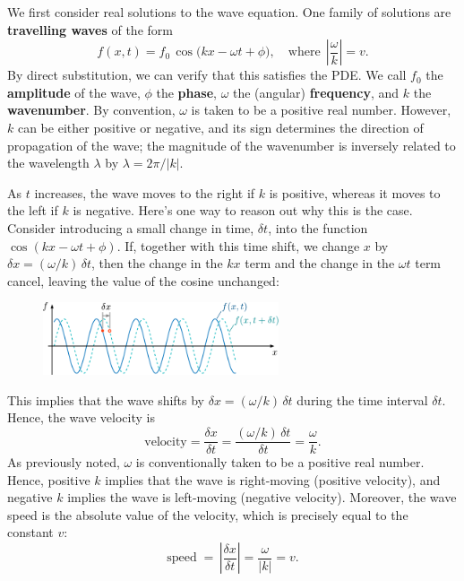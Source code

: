 \documentclass[10pt,a4paper]{article}
\begin{document}
We first consider real solutions to the wave equation. One family of
solutions are \textbf{travelling waves} of the form
\begin{equation}
f(x,t) = f_0 \, \cos\!\big(kx - \omega t + \phi\big),\quad\mathrm{where}\;\, \left|\frac{\omega}{k}\right| = v.
\label{realsol}
\end{equation}
By direct substitution, we can verify that this satisfies the PDE. We
call $f_0$ the \textbf{amplitude} of the wave, $\phi$ the
\textbf{phase}, $\omega$ the (angular) \textbf{frequency}, and $k$
the \textbf{wavenumber}. By convention, $\omega$ is taken to be a
positive real number. However, $k$ can be either positive or
negative, and its sign determines the direction of propagation of the
wave; the magnitude of the wavenumber is inversely related to the
wavelength $\lambda$ by $\lambda = 2\pi/|k|$.
    
As $t$ increases, the wave moves to the right if $k$ is positive,
whereas it moves to the left if $k$ is negative. Here's one way to
reason out why this is the case. Consider introducing a small change
in time, $\delta t$, into the function $\cos(kx - \omega t +
\phi)$. If, together with this time shift, we change $x$ by $\delta x
= (\omega/k)\, \delta t$, then the change in the $kx$ term and the
change in the $\omega t$ term cancel, leaving the value of the cosine
unchanged:

\begin{figure}[ht]
  \centering\includegraphics[width=0.62\textwidth]{wave_velocity}
\end{figure}

\noindent
This implies that the wave shifts by $\delta x = (\omega/k)\, \delta
t$ during the time interval $\delta t$. Hence, the wave velocity is
\begin{equation}
\textrm{velocity} = \frac{\delta x}{\delta t} = \frac{(\omega/k)\,\delta t}{\delta t} = \frac{\omega}{k}.
\end{equation}
As previously noted, $\omega$ is conventionally taken to be a positive
real number. Hence, positive $k$ implies that the wave is right-moving
(positive velocity), and negative $k$ implies the wave is left-moving
(negative velocity). Moreover, the wave speed is the absolute value of
the velocity, which is precisely equal to the constant $v$:
\begin{equation}
\textrm{speed}\; = \, \left|\frac{\delta x}{\delta t}\right| = \frac{\omega}{\left|k\right|} = v.
\end{equation}
\end{document}
